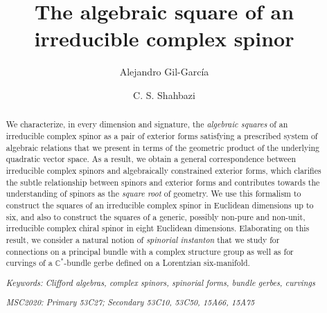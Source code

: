 \documentclass[10pt,a4paper,twoside,reqno]{amsart}
\theoremstyle{plain}
\theoremstyle{definition}
\theoremstyle{remark}
\begin{document}

\title[The algebraic square of an irreducible complex spinor]{The algebraic square of an irreducible complex spinor}

\author[Alejandro Gil-García]{Alejandro Gil-García }
\address{Beijing Institute of Mathematical Sciences and Applications, Beijing, China}

\author[C. S. Shahbazi]{C. S. Shahbazi }
\address{Departamento de Matem\'aticas, Universidad UNED - Madrid, Reino de Espa\~na}
 
\begin{abstract}
We characterize, in every dimension and signature, the \emph{algebraic squares} of an irreducible complex spinor as a pair of exterior forms satisfying a prescribed system of algebraic relations that we present in terms of the geometric product of the underlying quadratic vector space. As a result, we obtain a general correspondence between irreducible complex spinors and algebraically constrained exterior forms, which clarifies the subtle relationship between spinors and exterior forms and contributes towards the understanding of spinors as the \emph{square root} of geometry. We use this formalism to construct the squares of an irreducible complex spinor in Euclidean dimensions up to six, and also to construct the squares of a generic, possibly non-pure and non-unit, irreducible complex chiral spinor in eight Euclidean dimensions. Elaborating on this result, we consider a natural notion of \emph{spinorial instanton} that we study for connections on a principal bundle with a complex structure group as well as for curvings of a $\mathbb{C}^{\ast}$-bundle gerbe defined on a Lorentzian six-manifold.\bigskip

\noindent
\emph{Keywords: Clifford algebras, complex spinors, spinorial forms, bundle gerbes, curvings}\medskip

\noindent
\emph{MSC2020: Primary 53C27; Secondary 53C10, 53C50, 15A66, 15A75}

\end{abstract}

\maketitle

\setcounter{tocdepth}{1} %

\tableofcontents
\end{document}
